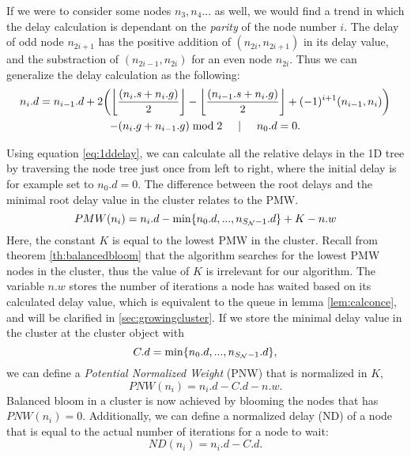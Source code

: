 If we were to consider some nodes $n_3, n_4...$ as well, we would find a trend in which the delay calculation is dependant on the \emph{parity} of the node number $i$. The delay of odd node $n_{2i+1}$ has the positive addition of $(n_{2i}, n_{2i+1})$ in its delay value, and the substraction of $(n_{2i-1}, n_{2i})$ for an even node $n_{2i}$. Thus we can generalize the delay calculation as the following:
\begin{multline}\label{eq:1ddelay}
n_i.d = n_{i-1}.d + 2\bigg({\left \lfloor \frac{(n_i.s+n_i.g)}{2} \right \rfloor } - {\left \lfloor \frac{(n_{i-1}.s+n_i.g)}{2} \right \rfloor } + (-1)^{i+1}(n_{i-1}, n_i)\bigg) \\
         - (n_{i}.g + n_{i-1}.g)\bmod 2 \hspace{.5cm} | \hspace{.5cm} n_0.d = 0.
\end{multline}

Using equation \ref{eq:1ddelay}, we can calculate all the relative delays in the 1D tree by traversing the node tree just once from left to right, where the initial delay is for example set to $n_0.d=0$. The difference between the root delays and the minimal root delay value in the cluster relates to the PMW.
\begin{equation}\label{eq:pmw}
  PMW(n_i) = n_i.d - \min \{n_0.d,...,n_{S_{\mathcal{N}}-1}.d\} + K - n.w
\end{equation}
Here, the constant $K$ is equal to the lowest PMW in the cluster. Recall from theorem \ref{th:balancedbloom} that the algorithm searches for the lowest PMW nodes in the cluster, thus the value of $K$ is irrelevant for our algorithm. The variable $n.w$ stores the number of iterations a node has waited based on its calculated delay value, which is equivalent to the queue in lemma \ref{lem:calconce}, and will be clarified in \ref{sec:growingcluster}. If we store the minimal delay value in the cluster at the cluster object with
\begin{equation}\label{eq:cd}
  C.d = \min \{n_0.d,...,n_{S_{\mathcal{N}}-1}.d\},
\end{equation}
we can define a \emph{Potential Normalized Weight} (PNW) that is normalized in $K$,
\begin{equation}\label{eq:pnw}
  PNW(n_i) = n_i.d - C.d - n.w.
\end{equation}
Balanced bloom in a cluster is now achieved by blooming the nodes that has $PNW(n_i) = 0$. Additionally, we can define a normalized delay (ND) of a node that is equal to the actual number of iterations for a node to wait:
\begin{equation}\label{eq:ad}
  ND(n_i) = n_i.d - C.d.
\end{equation}

